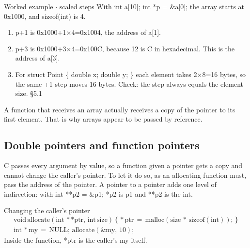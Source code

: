 \documentclass[11pt]{article}
\begin{document}
\begin{keepsection}
\begin{keepsection}
\begin{workedbox}{Worked example \ensuremath{\cdot} scaled steps}
With int a[10]; int *p = \&a[0]; the array starts at 0x1000, and sizeof(int) is 4.

\begin{enumerate}
\item p+1 is 0x1000+1\ensuremath{\times}4=0x1004, the address of a[1].
\item p+3 is 0x1000+3\ensuremath{\times}4=0x100C, because 12 is C in hexadecimal. This is the address of a[3].
\item For struct Point \{ double x; double y; \} each element takes 2\ensuremath{\times}8=16 bytes, so the same +1 step moves 16 bytes. Check: the step always equals the element size. \hfill{\small\color{FAUblue}§5.1}
\end{enumerate}
\end{workedbox}

A function that receives an array actually receives a copy of the pointer to its first element. That is why arrays appear to be passed by reference.
\end{keepsection}

\begin{keepsection}
\subsection{Double pointers and function pointers}

C passes every argument by value, so a function given a pointer gets a copy and cannot change the caller’s pointer. To let it do so, as an allocating function must, pass the address of the pointer. A pointer to a pointer adds one level of indirection: with int **p2 = \&p1; *p2 is p1 and **p2 is the int.

\begin{equationcard}{Changing the caller’s pointer}
\[ \begin{gathered} \text{void}\, \text{allocate}(\text{int}\, **\text{ptr},\, \text{int}\, \text{size})\, \{\, *\text{ptr}\, =\, \text{malloc}(\text{size}\, *\, \text{sizeof}(\text{int}));\, \} \\ \text{int}\, *\text{my}\, =\, \text{NULL};\, \text{allocate}(\&\text{my},\, 10); \end{gathered} \]
{\small Inside the function, *ptr is the caller’s my itself.}
\end{equationcard}


\end{keepsection}
\end{keepsection}
\end{document}
